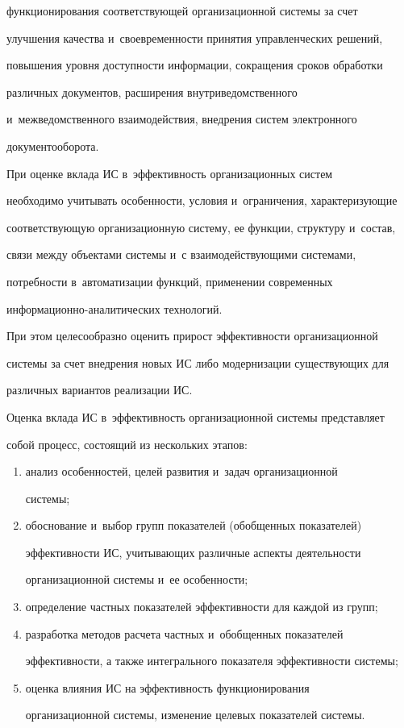 функционирования соответствующей организационной системы за счет 

улучшения качества и~своевременности принятия управленческих решений, 

повышения уровня доступности информации, сокращения сроков обработки 

различных документов, расширения внутриведомственного 

и~межведомственного взаимодействия, внед\-ре\-ния систем электронного 

документооборота.

  

  При оценке вклада ИС в~эффективность организационных систем 

необходимо учитывать особенности, условия и~ограничения, характеризующие 

соответствующую организационную систему, ее функции, структуру и~состав, 

связи между объектами системы и~с взаимодействующими системами, 

потребности в~автоматизации функций, применении современных 

информационно-аналитических технологий.


  При этом целесообразно оценить прирост эффективности организационной 

системы за счет внедрения новых ИС либо модернизации существующих для 

различных вариантов реализации ИС.

  

  Оценка вклада ИС в~эффективность организационной системы представляет 

собой процесс, состоящий из нескольких этапов:

  \begin{enumerate}[(1)]

  \item анализ особенностей, целей развития и~задач организационной 

системы; 

  \item обоснование и~выбор групп показателей (обобщенных показателей) 

эффективности ИС, учитывающих различные аспекты деятельности 

организационной системы и~ее особенности;

  \item определение частных показателей эффективности для каждой из групп;

  \item разработка методов расчета частных и~обобщенных показателей 

эффективности, а также интегрального показателя эффективности системы;

  \item оценка влияния ИС на эффективность функционирования 

организационной системы, изменение целевых показателей системы.

  \end{enumerate}


